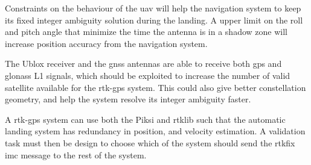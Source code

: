 Constraints on the behaviour of the \gls{uav} will help the navigation system to keep its fixed integer ambiguity solution during the landing. A upper limit on the roll and pitch angle that minimize the time the antenna is in a shadow zone will increase position accuracy from the navigation system.

The Ublox receiver and the \gls{gnss} antennas are able to receive both \gls{gps} and \gls{glonass} L1 signals, which should be exploited to increase the number of valid satellite available for the \gls{rtk-gps} system. This could also give better constellation geometry, and help the system resolve its integer ambiguity faster.
 

A \gls{rtk-gps} system can use both the Piksi and \gls{rtklib} such that the automatic landing system has redundancy in position, and velocity estimation. A validation task must then be design to choose which of the system should send the rtkfix \gls{imc} message to the rest of the system.

\cleardoublepage